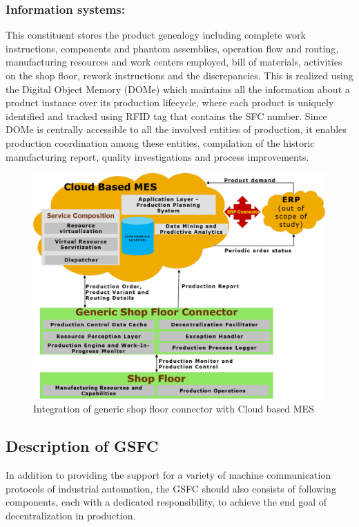 \documentclass[10pt,conference,compsocconf]{IEEEtran}
\begin{document}
\subsubsection{Information systems:}
This constituent stores the product genealogy including complete work instructions, components and phantom assemblies, operation flow and routing, manufacturing resources and work centers employed, bill of materials, activities on the shop floor, rework instructions and the discrepancies. This is realized using the Digital Object Memory (DOMe) \cite{Haupert:2013:DOMeMan} which maintains all the information about a product instance over its production lifecycle, where each product is uniquely identified and tracked using RFID tag that contains the SFC number. Since DOMe is centrally accessible to all the involved entities of production, it enables production coordination among these entities, compilation of the historic manufacturing report, quality investigations and process improvements.
\begin{figure} [h]
\centering
\includegraphics [scale=0.33]{"Figures/Integration_of_generic_shop_floor_connector_with_Cloud_MES"}
\caption{Integration of generic shop floor connector with Cloud based MES}
\label{fig:Integration_of_generic_shop_floor_connector_with_Cloud_MES}
\end{figure}
\subsection{Description of GSFC}
In addition to providing the support for a variety of machine communication protocols of industrial automation, the GSFC should also consists of following components, each with a dedicated responsibility, to achieve the end goal of decentralization in production.
\end{document}
